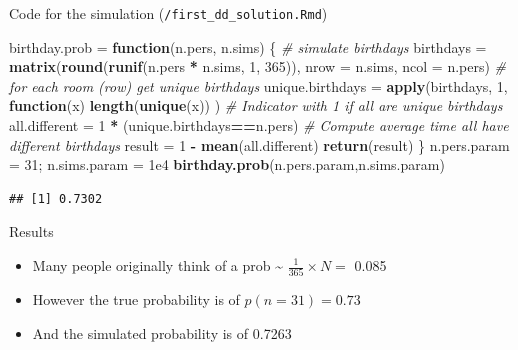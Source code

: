 \documentclass[ignorenonframetext,]{beamer}
\newenvironment{Shaded}{\begin{snugshade}}{\end{snugshade}}
\newcommand{\CommentTok}[1]{\textcolor[rgb]{0.56,0.35,0.01}{\textit{#1}}}
\newcommand{\ControlFlowTok}[1]{\textcolor[rgb]{0.13,0.29,0.53}{\textbf{#1}}}
\newcommand{\DataTypeTok}[1]{\textcolor[rgb]{0.13,0.29,0.53}{#1}}
\newcommand{\DecValTok}[1]{\textcolor[rgb]{0.00,0.00,0.81}{#1}}
\newcommand{\FloatTok}[1]{\textcolor[rgb]{0.00,0.00,0.81}{#1}}
\newcommand{\KeywordTok}[1]{\textcolor[rgb]{0.13,0.29,0.53}{\textbf{#1}}}
\newcommand{\NormalTok}[1]{#1}
\newcommand{\OperatorTok}[1]{\textcolor[rgb]{0.81,0.36,0.00}{\textbf{#1}}}
\newcommand{\StringTok}[1]{\textcolor[rgb]{0.31,0.60,0.02}{#1}}
\providecommand{\tightlist}{%
  \setlength{\itemsep}{0pt}\setlength{\parskip}{0pt}}
\begin{document}
\begin{frame}[fragile]{Code for the simulation
(\texttt{/first\_dd\_solution.Rmd})}
\protect\hypertarget{code-for-the-simulation-first_dd_solution.rmd}{}

\begin{Shaded}
\begin{Highlighting}[]
\NormalTok{birthday.prob =}\StringTok{ }\ControlFlowTok{function}\NormalTok{(n.pers, n.sims) \{}
  \CommentTok{# simulate birthdays}
\NormalTok{  birthdays =}\StringTok{ }\KeywordTok{matrix}\NormalTok{(}\KeywordTok{round}\NormalTok{(}\KeywordTok{runif}\NormalTok{(n.pers }\OperatorTok{*}\StringTok{ }\NormalTok{n.sims, }
                                 \DecValTok{1}\NormalTok{, }\DecValTok{365}\NormalTok{)), }
                      \DataTypeTok{nrow =}\NormalTok{ n.sims, }\DataTypeTok{ncol =}\NormalTok{ n.pers)}
  \CommentTok{# for each room (row) get unique birthdays}
\NormalTok{  unique.birthdays =}\StringTok{ }\KeywordTok{apply}\NormalTok{(birthdays, }\DecValTok{1}\NormalTok{, }
                           \ControlFlowTok{function}\NormalTok{(x) }
                             \KeywordTok{length}\NormalTok{(}\KeywordTok{unique}\NormalTok{(x)) )}
  \CommentTok{# Indicator with 1 if all are unique birthdays}
\NormalTok{  all.different =}\StringTok{ }\DecValTok{1} \OperatorTok{*}\StringTok{ }\NormalTok{(unique.birthdays}\OperatorTok{==}\NormalTok{n.pers)}
  \CommentTok{# Compute average time all have different birthdays }
\NormalTok{  result =}\StringTok{ }\DecValTok{1} \OperatorTok{-}\StringTok{ }\KeywordTok{mean}\NormalTok{(all.different)}
\KeywordTok{return}\NormalTok{(result)}
\NormalTok{\}}
\NormalTok{n.pers.param =}\StringTok{ }\DecValTok{31}\NormalTok{; n.sims.param =}\StringTok{ }\FloatTok{1e4}
\KeywordTok{birthday.prob}\NormalTok{(n.pers.param,n.sims.param)}
\end{Highlighting}
\end{Shaded}

\begin{verbatim}
## [1] 0.7302
\end{verbatim}

\end{frame}

\begin{frame}{Results}
\protect\hypertarget{results}{}

\begin{itemize}
\tightlist
\item
  Many people originally think of a prob \textasciitilde{}
  \(\frac{1}{365} \times N =\) 0.085
\item
  However the true probability is of \(p(n= 31) = 0.73\)
\item
  And the simulated probability is of 0.7263
\end{itemize}

\end{frame}
\end{document}

